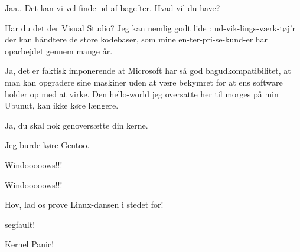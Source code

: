 \documentclass[a4paper,11pt]{article}
\begin{document}
\begin{sketch}
 Jaa.. Det kan vi vel finde ud af bagefter. Hvad vil du have?

 Har du det der Visual Studio? Jeg kan nemlig godt lide : ud-vik-lings-værk-tøj'r der kan håndtere de store kodebaser,
som mine en-ter-pri-se-kund-er har oparbejdet gennem mange år.

 Ja, det er faktisk imponerende at Microsoft har så god
bagudkompatibilitet, at man kan opgradere sine maskiner uden at være
bekymret for at ens software holder op med at virke. Den hello-world jeg
oversatte her til morges på min Ubunut, kan ikke køre længere.

 Ja, du skal nok genoversætte din kerne.


 Jeg burde køre Gentoo.


 Windooooows!!! 

 Windooooows!!!


 Hov, lad os prøve Linux-dansen i stedet for!

 segfault! 

 Kernel Panic! 


\end{sketch}
\end{document}
